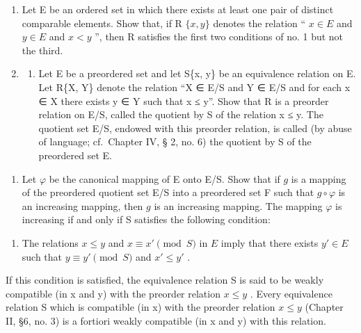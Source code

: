 \exercisegroup

\begin{enumerate}
\def\labelenumi{\arabic{enumi}.}
\item
  Let E be an ordered set in which there exists at least one pair of distinct comparable elements. Show that, if R \(\{x, y\}\) denotes the relation `` \(x \in E\) and \(y \in E\) and \(x < y\) '', then R satisfies the first two conditions of no. 1 but not the third.
\item
  \begin{enumerate}
  \def\labelenumii{(\alph{enumii})}
  \tightlist
  \item
    Let E be a preordered set and let S\{x, y\} be an equivalence relation on E. Let R\{X, Y\} denote the relation ``X ∈ E/S and Y ∈ E/S and for each x ∈ X there exists y ∈ Y such that x ≤ y''. Show that R is a preorder relation on E/S, called the quotient by S of the relation x ≤ y. The quotient set E/S, endowed with this preorder relation, is called (by abuse of language; cf.~Chapter IV, § 2, no. 6) the quotient by S of the preordered set E.
  \end{enumerate}
\end{enumerate}

\begin{enumerate}
\def\labelenumi{(\alph{enumi})}
\setcounter{enumi}{1}
\tightlist
\item
  Let \(\varphi\) be the canonical mapping of E onto E/S. Show that if \(g\) is a mapping of the preordered quotient set E/S into a preordered set F such that \(g \circ \varphi\) is an increasing mapping, then \(g\) is an increasing mapping. The mapping \(\varphi\) is increasing if and only if S satisfies the following condition:
\end{enumerate}

\begin{enumerate}
\def\labelenumi{(\Alph{enumi})}
\setcounter{enumi}{2}
\tightlist
\item
  The relations \(x \leqslant y\) and \(x \equiv x' \pmod{S}\) in \(E\) imply that there exists \(y' \in E\) such that \(y \equiv y' \pmod{S}\) and \(x' \leqslant y'\) .
\end{enumerate}

If this condition is satisfied, the equivalence relation S is said to be weakly compatible (in x and y) with the preorder relation \(x \leqslant y\) . Every equivalence relation S which is compatible (in x) with the preorder relation \(x \leqslant y\) (Chapter II, §6, no. 3) is a fortiori weakly compatible (in x and y) with this relation.


